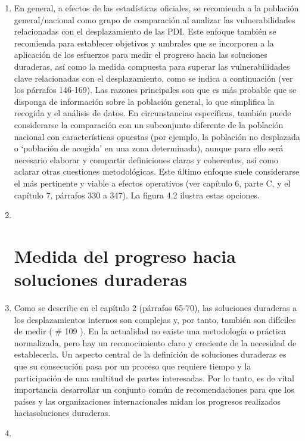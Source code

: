 \documentclass[
]{book}
\begin{document}
\begin{enumerate}
\def\labelenumi{\arabic{enumi}.}
\item
  En general, a efectos de las estadísticas oficiales, se recomienda a la población general/nacional como grupo de comparación al analizar las vulnerabilidades relacionadas con el desplazamiento de las PDI. Este enfoque también se recomienda para establecer objetivos y umbrales que se incorporen a la aplicación de los esfuerzos para medir el progreso hacia las soluciones duraderas, así como la medida compuesta para superar las vulnerabilidades clave relacionadas con el desplazamiento, como se indica a continuación (ver los párrafos 146-169). Las razones principales son que es más probable que se disponga de información sobre la población general, lo que simplifica la recogida y el análisis de datos. En circunstancias específicas, también puede considerarse la comparación con un subconjunto diferente de la población nacional con características opuestas (por ejemplo, la población no desplazada o `población de acogida' en una zona determinada), aunque para ello será necesario elaborar y compartir definiciones claras y coherentes, así como aclarar otras cuestiones metodológicas. Este último enfoque suele considerarse el más pertinente y viable a efectos operativos (ver capítulo 6, parte C, y el capítulo 7, párrafos 330 a 347). La figura 4.2 ilustra estas opciones.
\item ~
  \hypertarget{medida-del-progreso-hacia-soluciones-duraderas}{%
  \section{Medida del progreso hacia soluciones duraderas}\label{medida-del-progreso-hacia-soluciones-duraderas}}
\item
  Como se describe en el capítulo 2 (párrafos 65-70), las soluciones duraderas a los desplazamientos internos son complejas y, por tanto, también son difíciles de medir (
  \# 109
  ). En la actualidad no existe una metodología o práctica normalizada, pero hay un reconocimiento claro y creciente de la necesidad de establecerla. Un aspecto central de la definición de soluciones duraderas es que su consecución pasa por un proceso que requiere tiempo y la participación de una multitud de partes interesadas. Por lo tanto, es de vital importancia desarrollar un conjunto común de recomendaciones para que los países y las organizaciones internacionales midan los progresos realizados haciasoluciones duraderas.
\item ~
  \hypertarget{esquema-de-la-medida-del-progreso}{%
}
\end{enumerate}
\end{document}
